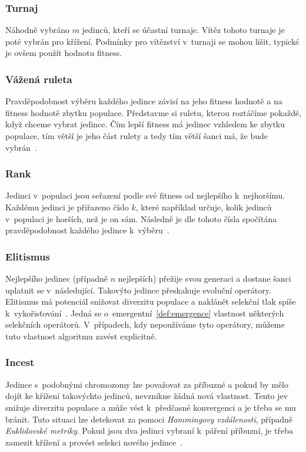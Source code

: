 \subsubsection*{Turnaj}
Náhodně vybráno $m$ jedinců, kteří se účastní turnaje. Vítěz tohoto turnaje je poté vybrán pro křížení. Podmínky pro vítězství v~turnaji se mohou lišit, typické je ovšem použít hodnotu fitness. 

\subsubsection*{Vážená ruleta}
Pravděpodobnost výběru každého jedince závisí na jeho fitness hodnotě a na fitness hodnotě zbytku populace. Představme si ruletu, kterou roztáčíme pokaždé, když chceme vybrat jedince. Čím lepší fitness má jedinec vzhledem ke zbytku populace, tím větší je jeho část rulety a tedy tím větší šanci má, že bude vybrán~\cite{EVO, Weisser2010}.

\subsubsection*{Rank}
Jedinci v~populaci jsou seřazení podle své fitness od nejlepšího k~nejhoršímu. Každému jedinci je přiřazeno číslo $k$, které například určuje, kolik jedinců v~populaci je horších, než je on sám. Následně je dle tohoto čísla spočítána pravděpodobnost každého jedince k~výběru~\cite{EVO, Weisser2010}.

\subsubsection*{Elitismus}
Nejlepšího jedinec (případně $n$ nejlepších) přežije svou generaci a dostane šanci uplatnit se v~následující. Takovýto jedince přeskakuje evoluční operátory. Elitismus má potenciál snižovat diverzitu populace a naklánět selekční tlak spíše k~vykořisťování~\cite{EVO}. Jedná se o~emergentní~\ref{def:emergence} vlastnost některých selekčních operátorů. V~případech, kdy nepoužíváme tyto operátory, můžeme tuto vlastnost algoritmu zavést explicitně. 

\subsubsection*{Incest}
Jedince s~podobnými chromozomy lze považovat za příbuzné a pokud by mělo dojít ke křížení takovýchto jedinců, nevznikne žádná nová vlastnost. Tento jev snižuje diverzitu populace a může vést k~předčasné konvergenci a je třeba se mu bránit. Tuto situaci lze detekovat za pomoci \textit{Hammingovy vzdálenosti}, případně \textit{Euklidovské metriky}. Pokud jsou dva jedinci vybraní k~páření příbuzní, je třeba zamezit křížení a provést selekci nového jedince~\cite{Weisser2010}.

